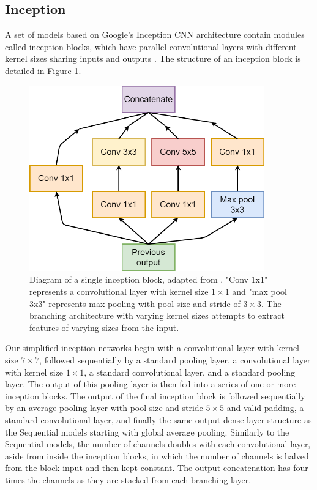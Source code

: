 \documentclass[12pt]{article}
\begin{document}
\subsection{Inception}
A set of models based on Google's Inception CNN architecture contain modules called inception blocks, which have parallel convolutional layers with different kernel sizes sharing inputs and outputs \cite{Szegedy15}. The structure of an inception block is detailed in Figure \ref{incblock}. 
\begin{figure}[!h]
\centering
\includegraphics[width=4in]{images/inception_block.png}
\caption{Diagram of a single inception block, adapted from \cite{Szegedy15}. "Conv 1x1" represents a convolutional layer with kernel size $1\times1$ and "max pool 3x3" represents max pooling with pool size and stride of $3\times3$. The branching architecture with varying kernel sizes attempts to extract features of varying sizes from the input.}
\label{incblock}
\end{figure}
Our simplified inception networks begin with a convolutional layer with kernel size $7\times7$, followed sequentially by a standard pooling layer, a convolutional layer with kernel size $1\times1$, a standard convolutional layer, and a standard pooling layer. The output of this pooling layer is then fed into a series of one or more inception blocks. The output of the final inception block is followed sequentially by an average pooling layer with pool size and stride $5\times5$ and valid padding, a standard convolutional layer, and finally the same output dense layer structure as the Sequential models starting with global average pooling. Similarly to the Sequential models, the number of channels doubles with each convolutional layer, aside from inside the inception blocks, in which the number of channels is halved from the block input and then kept constant. The output concatenation has four times the channels as they are stacked from each branching layer.
\end{document}
